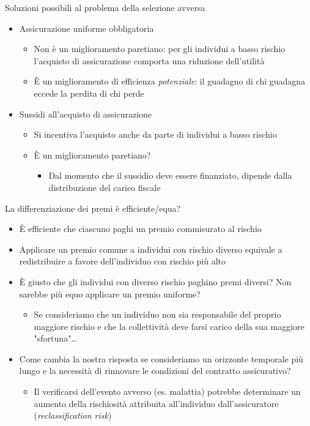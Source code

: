 \documentclass[aspectratio=64,11pt]{beamer}
\begin{document}
\begin{frame}{Soluzioni possibili al problema della selezione avversa}
\begin{itemize}
\item Assicurazione uniforme obbligatoria 

\begin{itemize}
\item Non è un miglioramento paretiano: per gli individui a basso
rischio l'acquisto di assicurazione comporta una riduzione dell'utilità

\item È un miglioramento di efficienza \emph{potenziale}: il guadagno di chi guadagna
eccede la perdita di chi perde
\end{itemize}

\item Sussidi all'acquisto di assicurazione

\begin{itemize}
\item Si incentiva l'acquisto anche da parte di individui a basso rischio

\item È un miglioramento paretiano?
\begin{itemize}
\item Dal momento che il sussidio deve essere finanziato, dipende dalla
distribuzione del carico fiscale
\end{itemize}
\end{itemize}
\end{itemize}
\end{frame}

\begin{frame}{La differenziazione dei premi è efficiente/equa?}
\begin{itemize}
\item È efficiente che ciascuno paghi un premio commisurato al rischio
\item Applicare un premio comune a individui con rischio diverso equivale a
redistribuire a favore dell'individuo con rischio più alto
\item È giusto che gli individui con diverso rischio paghino premi diversi? Non
sarebbe più equo applicare un premio uniforme?
\begin{itemize}
\item Se consideriamo che un individuo non sia responsabile del proprio maggiore
rischio e che la collettività deve farsi carico della sua maggiore
"sfortuna"\ldots{}
\end{itemize}
\item Come cambia la nostra risposta se consideriamo un orizzonte temporale più
lungo e la necessità di rinnovare le condizioni del contratto assicurativo?
\begin{itemize}
\item Il verificarsi dell'evento avverso (es. malattia) potrebbe
determinare un aumento della rischiosità attribuita all'individuo
dall'assicuratore (\emph{reclassification risk})
\end{itemize}
\end{itemize}
\end{frame}
\end{document}
